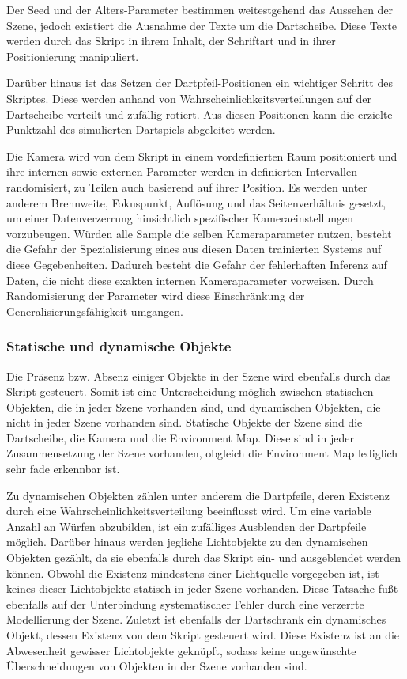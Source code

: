Der Seed und der Alters-Parameter bestimmen weitestgehend das Aussehen der Szene, jedoch existiert die Ausnahme der Texte um die Dartscheibe. Diese Texte werden durch das Skript in ihrem Inhalt, der Schriftart und in ihrer Positionierung manipuliert.

Darüber hinaus ist das Setzen der Dartpfeil-Positionen ein wichtiger Schritt des Skriptes. Diese werden anhand von Wahrscheinlichkeitsverteilungen auf der Dartscheibe verteilt und zufällig rotiert. Aus diesen Positionen kann die erzielte Punktzahl des simulierten Dartspiels abgeleitet werden.

Die Kamera wird von dem Skript in einem vordefinierten Raum positioniert und ihre internen sowie externen Parameter werden in definierten Intervallen randomisiert, zu Teilen auch basierend auf ihrer Position. Es werden unter anderem Brennweite, Fokuspunkt, Auflösung und das Seitenverhältnis gesetzt, um einer Datenverzerrung hinsichtlich spezifischer Kameraeinstellungen vorzubeugen. Würden alle Sample die selben Kameraparameter nutzen, besteht die Gefahr der Spezialisierung eines aus diesen Daten trainierten Systems auf diese Gegebenheiten. Dadurch besteht die Gefahr der fehlerhaften Inferenz auf Daten, die nicht diese exakten internen Kameraparameter vorweisen. Durch Randomisierung der Parameter wird diese Einschränkung der Generalisierungsfähigkeit umgangen.

\subsubsection{Statische und dynamische Objekte}

Die Präsenz bzw. Absenz einiger Objekte in der Szene wird ebenfalls durch das Skript gesteuert. Somit ist eine Unterscheidung möglich zwischen statischen Objekten, die in jeder Szene vorhanden sind, und dynamischen Objekten, die nicht in jeder Szene vorhanden sind. Statische Objekte der Szene sind die Dartscheibe, die Kamera und die Environment Map. Diese sind in jeder Zusammensetzung der Szene vorhanden, obgleich die Environment Map lediglich sehr fade erkennbar ist.

Zu dynamischen Objekten zählen unter anderem die Dartpfeile, deren Existenz durch eine Wahrscheinlichkeitsverteilung beeinflusst wird. Um eine variable Anzahl an Würfen abzubilden, ist ein zufälliges Ausblenden der Dartpfeile möglich. Darüber hinaus werden jegliche Lichtobjekte zu den dynamischen Objekten gezählt, da sie ebenfalls durch das Skript ein- und ausgeblendet werden können. Obwohl die Existenz mindestens einer Lichtquelle vorgegeben ist, ist keines dieser Lichtobjekte statisch in jeder Szene vorhanden. Diese Tatsache fußt ebenfalls auf der Unterbindung systematischer Fehler durch eine verzerrte Modellierung der Szene. Zuletzt ist ebenfalls der Dartschrank ein dynamisches Objekt, dessen Existenz von dem Skript gesteuert wird. Diese Existenz ist an die Abwesenheit gewisser Lichtobjekte geknüpft, sodass keine ungewünschte Überschneidungen von Objekten in der Szene vorhanden sind.

